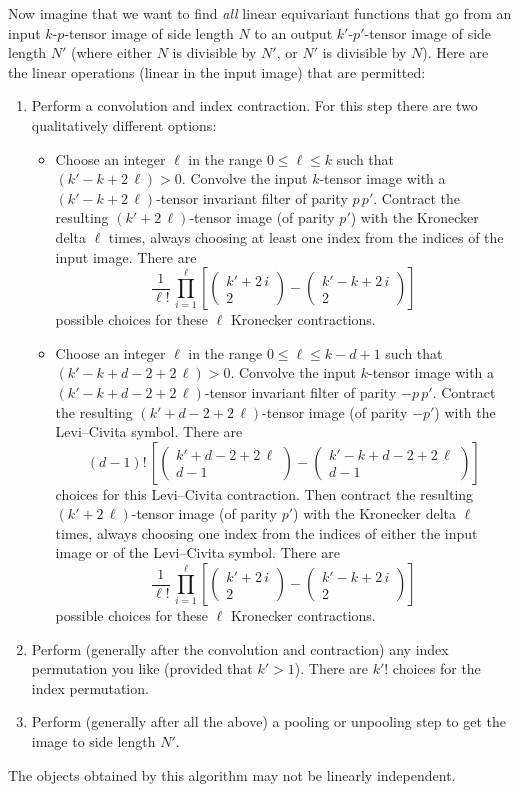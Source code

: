 \documentclass{article}
\theoremstyle{plain}
\renewcommand{\choose}[2]{\begin{pmatrix}{#1}\\{#2}\end{pmatrix}}
\begin{document}
Now imagine that we want to find \emph{all} linear equivariant functions that go from an input $k$-$p$-tensor image of side length $N$ to an output $k'$-$p'$-tensor image of side length $N'$ (where either $N$ is divisible by $N'$, or $N'$ is divisible by $N$).
Here are the linear operations (linear in the input image) that are permitted:
\begin{enumerate}
    \item Perform a convolution and index contraction. For this step there are two qualitatively different options:
        \begin{itemize}
            \item Choose an integer $\ell$ in the range $0\leq\ell\leq k$ such that $(k'-k+2\,\ell)>0$.
              Convolve the input $k$-tensor image with a $(k'-k+2\,\ell)$-tensor invariant filter of parity $p\,p'$.
              Contract the resulting $(k'+2\,\ell)$-tensor image (of parity $p'$) with the Kronecker delta $\ell$ times, always choosing at least one index from the indices of the input image.
              There are $$\frac{1}{\ell!}\,\prod_{i=1}^{\ell}\left[\choose{k'+2\,i}{2}-\choose{k'-k+2\,i}{2}\right]$$ possible choices for these $\ell$ Kronecker contractions.
            \item Choose an integer $\ell$ in the range $0\leq\ell\leq k-d+1$ such that $(k'-k+d-2+2\,\ell)>0$.
              Convolve the input $k$-tensor image with a $(k'-k+d-2+2\,\ell)$-tensor invariant filter of parity $-p\,p'$.
              Contract the resulting $(k'+d-2+2\,\ell)$-tensor image (of parity $-p'$) with the Levi--Civita symbol.
              There are $$(d-1)!\,\left[\choose{k'+d-2+2\,\ell}{d-1}-\choose{k'-k+d-2+2\,\ell}{d-1}\right]$$ choices for this Levi--Civita contraction.
              Then contract the resulting $(k'+2\,\ell)$-tensor image (of parity $p'$) with the Kronecker delta $\ell$ times, always choosing one index from the indices of either the input image or of the Levi--Civita symbol.
              There are $$\frac{1}{\ell!}\,\prod_{i=1}^{\ell}\left[\choose{k'+2\,i}{2}-\choose{k'-k+2\,i}{2}\right]$$ possible choices for these $\ell$ Kronecker contractions.
        \end{itemize}
    \item Perform (generally after the convolution and contraction) any index permutation you like (provided that $k'>1$).
      There are $k'!$ choices for the index permutation.
    \item Perform (generally after all the above) a pooling or unpooling step to get the image to side length $N'$.
\end{enumerate}
The objects obtained by this algorithm may not be linearly independent.
\end{document}
